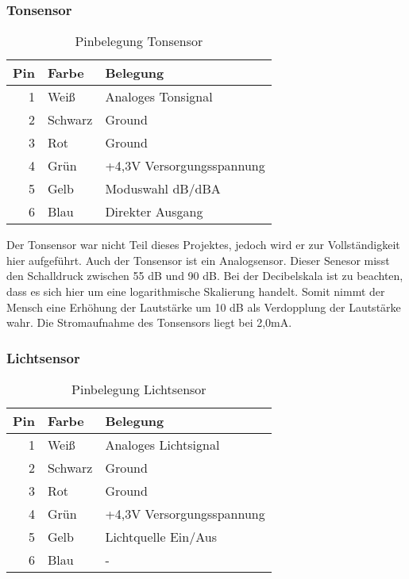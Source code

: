 \subsubsection{Tonsensor}
\begin{table}[!ht]
\centering
\rmfamily
\caption{Pinbelegung Tonsensor}
\renewcommand{\arraystretch}{1.1}
\sffamily
\begin{footnotesize}
\begin{tabular}{r | l l}
\toprule
\textbf{Pin} & \textbf{Farbe}  & \textbf{Belegung}\\
\midrule
1 & Weiß & Analoges Tonsignal \\
2 & Schwarz & Ground \\
3 & Rot & Ground \\
4 & Grün & +4,3V Versorgungsspannung \\
5 & Gelb & Moduswahl dB/dBA \\
6 & Blau & Direkter Ausgang \\
\bottomrule
\end{tabular}
\end{footnotesize}
\label{tonsensor:tbl}
\end{table}
Der Tonsensor war nicht Teil dieses Projektes, jedoch wird er zur Vollständigkeit hier aufgeführt. Auch der Tonsensor ist ein Analogsensor. Dieser Senesor misst den Schalldruck zwischen 55 dB und 90 dB. Bei der Decibelskala ist zu beachten, dass es sich hier um eine logarithmische Skalierung handelt. Somit nimmt der Mensch eine Erhöhung der Lautstärke um 10 dB als Verdopplung der Lautstärke wahr. Die Stromaufnahme des Tonsensors liegt bei 2,0mA.

\subsubsection{Lichtsensor}
\begin{table}[!ht]
\centering
\rmfamily
\caption{Pinbelegung Lichtsensor}
\renewcommand{\arraystretch}{1.1}
\sffamily
\begin{footnotesize}
\begin{tabular}{r | l l}
\toprule
\textbf{Pin} & \textbf{Farbe}  & \textbf{Belegung}\\
\midrule
1 & Weiß & Analoges Lichtsignal \\
2 & Schwarz & Ground \\
3 & Rot & Ground \\
4 & Grün & +4,3V Versorgungsspannung \\
5 & Gelb & Lichtquelle Ein/Aus \\
6 & Blau & - \\
\bottomrule
\end{tabular}
\end{footnotesize}
\label{lichtsensor:tbl}
\end{table}

